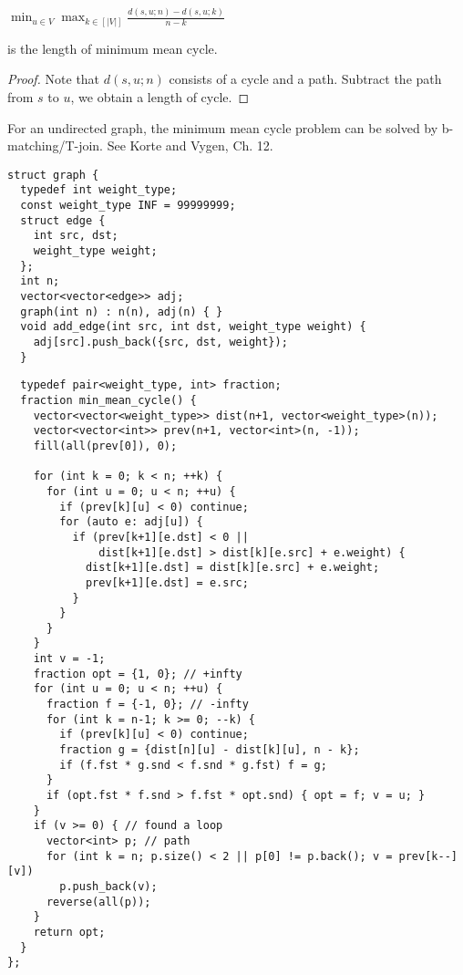 \begin{center}
  $\displaystyle \min_{u \in V} { \max_{k \in [|V|]} { \frac{d(s,u;n) - d(s,u;k)}{n-k} } }$
\end{center}

is the length of minimum mean cycle.

\begin{proof}
Note that $d(s,u;n)$ consists of a cycle and a path.
Subtract the path from $s$ to $u$, we obtain a length of cycle.
\end{proof}

\begin{remark}
For an undirected graph, the minimum mean cycle problem can be solved by
b-matching/T-join. See Korte and Vygen, Ch. 12.
\end{remark}


\begin{center}
\begin{minipage}[t]{0.45\linewidth}
\begin{lstlisting}
struct graph {
  typedef int weight_type;
  const weight_type INF = 99999999;
  struct edge {
    int src, dst;
    weight_type weight;
  };
  int n;
  vector<vector<edge>> adj;
  graph(int n) : n(n), adj(n) { }
  void add_edge(int src, int dst, weight_type weight) {
    adj[src].push_back({src, dst, weight}); 
  }
\end{lstlisting}
\end{minipage}
\qquad
\begin{minipage}[t]{0.45\linewidth}
\begin{lstlisting}
  typedef pair<weight_type, int> fraction;
  fraction min_mean_cycle() {
    vector<vector<weight_type>> dist(n+1, vector<weight_type>(n));
    vector<vector<int>> prev(n+1, vector<int>(n, -1));
    fill(all(prev[0]), 0);

    for (int k = 0; k < n; ++k) {
      for (int u = 0; u < n; ++u) {
        if (prev[k][u] < 0) continue;
        for (auto e: adj[u]) {
          if (prev[k+1][e.dst] < 0 ||
              dist[k+1][e.dst] > dist[k][e.src] + e.weight) {
            dist[k+1][e.dst] = dist[k][e.src] + e.weight;
            prev[k+1][e.dst] = e.src;
          }
        }
      }
    }
    int v = -1;
    fraction opt = {1, 0}; // +infty
    for (int u = 0; u < n; ++u) {
      fraction f = {-1, 0}; // -infty
      for (int k = n-1; k >= 0; --k) {
        if (prev[k][u] < 0) continue;
        fraction g = {dist[n][u] - dist[k][u], n - k};
        if (f.fst * g.snd < f.snd * g.fst) f = g;
      }
      if (opt.fst * f.snd > f.fst * opt.snd) { opt = f; v = u; }
    }
    if (v >= 0) { // found a loop
      vector<int> p; // path
      for (int k = n; p.size() < 2 || p[0] != p.back(); v = prev[k--][v]) 
        p.push_back(v);
      reverse(all(p));
    }
    return opt; 
  }
};
\end{lstlisting}
\end{minipage}
\end{center}

